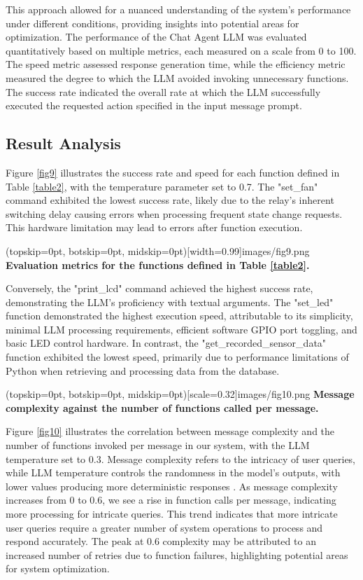\documentclass{ieeeaccess}
\begin{document}
This approach allowed for a nuanced understanding of the system's performance under different conditions, providing insights into potential areas for optimization. The performance of the Chat Agent LLM was evaluated quantitatively based on multiple metrics, each measured on a scale from 0 to 100. The speed metric assessed response generation time, while the efficiency metric measured the degree to which the LLM avoided invoking unnecessary functions. The success rate indicated the overall rate at which the LLM successfully executed the requested action specified in the input message prompt.

\subsection{Result Analysis}
Figure \ref{fig9} illustrates the success rate and speed for each function defined in Table \ref{table2}, with the temperature parameter set to 0.7. The "set\_fan" command exhibited the lowest success rate, likely due to the relay's inherent switching delay causing errors when processing frequent state change requests. This hardware limitation may lead to errors after function execution.  

\Figure[h!](topskip=0pt, botskip=0pt,
midskip=0pt)[width=0.99\columnwidth]{{images/fig9.png}}
{ \textbf{Evaluation metrics for the functions defined in Table \ref{table2}.}\label{fig9}}

Conversely, the "print\_lcd" command achieved the highest success rate, demonstrating the LLM's proficiency with textual arguments. The "set\_led" function demonstrated the highest execution speed, attributable to its simplicity, minimal LLM processing requirements, efficient software GPIO port toggling, and basic LED control hardware. In contrast, the "get\_recorded\_sensor\_data" function exhibited the lowest speed, primarily due to performance limitations of Python when retrieving and processing data from the database.

\Figure[t!](topskip=0pt, botskip=0pt,
midskip=0pt)[scale=0.32]{{images/fig10.png}}
{ \textbf{Message complexity against the number of functions called per message.}\label{fig10}}

Figure \ref{fig10} illustrates the correlation between message complexity and the number of functions invoked per message in our system, with the LLM temperature set to 0.3. Message complexity refers to the intricacy of user queries, while LLM temperature controls the randomness in the model's outputs, with lower values producing more deterministic responses \cite{rum2024setting}. As message complexity increases from 0 to 0.6, we see a rise in function calls per message, indicating more processing for intricate queries. This trend indicates that more intricate user queries require a greater number of system operations to process and respond accurately. The peak at 0.6 complexity may be attributed to an increased number of retries due to function failures, highlighting potential areas for system optimization. 
\end{document}
